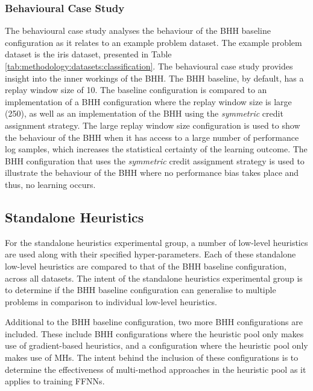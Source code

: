 \subsubsection{Behavioural Case Study}
\label{sec:methodology:experiments:case_study}

The behavioural case study analyses the behaviour of the \acs{BHH} baseline configuration as it relates to an example problem dataset. The example problem dataset is the iris dataset, presented in Table \ref{tab:methodology:datasets:classification}. The behavioural case study provides insight into the inner workings of the \acs{BHH}. The \acs{BHH} baseline, by default, has a replay window size of 10. The baseline configuration is compared to an implementation of a \acs{BHH} configuration where the replay window size is large (250), as well as an implementation of the \acs{BHH} using the \textit{symmetric} credit assignment strategy. The large replay window size configuration is used to show the behaviour of the \acs{BHH} when it has access to a large number of performance log samples, which increases the statistical certainty of the learning outcome. The \acs{BHH} configuration that uses the \textit{symmetric} credit assignment strategy is used to illustrate the behaviour of the \acs{BHH} where no performance bias takes place and thus, no learning occurs.

\subsection{Standalone Heuristics}
\label{sec:methodology:experiments:standalone_optimisers}

For the standalone heuristics experimental group, a number of low-level heuristics are used along with their specified hyper-parameters. Each of these standalone low-level heuristics are compared to that of the \acs{BHH} baseline configuration, across all datasets. The intent of the standalone heuristics experimental group is to determine if the \acs{BHH} baseline configuration can generalise to multiple problems in comparison to individual low-level heuristics.

Additional to the \acs{BHH} baseline configuration, two more \acs{BHH} configurations are included. These include \acs{BHH} configurations where the heuristic pool only makes use of gradient-based heuristics, and a configuration where the heuristic pool only makes use of \acp{MH}. The intent behind the inclusion of these configurations is to determine the effectiveness of multi-method approaches in the heuristic pool as it applies to training \acp{FFNN}.

